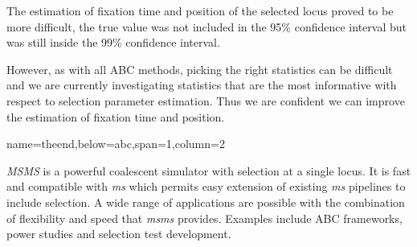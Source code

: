\documentclass[portrait,final]{baposter}
\begin{document}
\begin{poster}
{

\vspace{0.5em}

The estimation of fixation time and position of the selected locus proved to be more difficult, the 
true value was not included in the 95\% confidence interval but was still
inside the 99\% confidence interval.

However, as with all ABC methods, picking the right statistics can be difficult
and we are currently investigating statistics that are the most informative with
respect to selection parameter estimation. Thus we are confident we can improve
the estimation of fixation time and position.

\vspace{0.5em}
}

 {name=theend,below=abc,span=1,column=2}{
 
 {\it MSMS}\cite{ewing2010} is a powerful coalescent simulator with selection
 at a single locus. It is fast and compatible with {\it ms} which permits easy extension of
 existing {\it ms} pipelines to include selection. A wide range of applications
 are possible with the combination of flexibility and speed that {\it msms}
 provides. Examples include ABC frameworks, power studies and selection test
 development.  
 
}
\end{poster}
\end{document}
